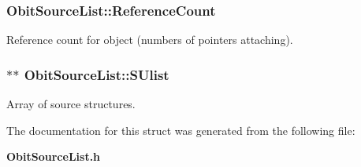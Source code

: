 \subsubsection{ {\bf Obit\-Source\-List::Reference\-Count}}\label{structObitSourceList_o2}


Reference count for object (numbers of pointers attaching). 

\subsubsection{$\ast$$\ast$ {\bf Obit\-Source\-List::SUlist}}\label{structObitSourceList_o5}


Array of source structures. 



The documentation for this struct was generated from the following file:\begin{CompactItemize}
\item 
{\bf Obit\-Source\-List.h}\end{CompactItemize}
